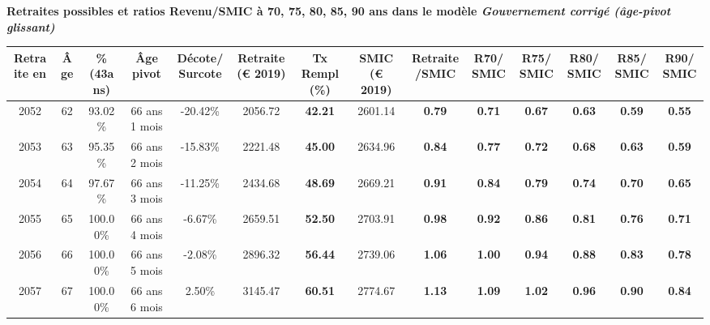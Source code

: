  \vspace{0.1cm} 
{\bf \noindent Retraites possibles et ratios Revenu/SMIC à 70, 75, 80, 85, 90 ans dans le modèle \emph{Gouvernement corrigé (âge-pivot glissant)}}  
 
\begin{adjustbox}{max width=\textwidth} 
\begin{tabular}[htb]{|c|c||c|c|c||c|c||c|c||c|c|c|c|c|} 
\hline 
 Retraite en &  Âge &  \%(43ans) &  Âge pivot &  Décote/Surcote &  Retraite (\euro{} 2019) &  Tx Rempl(\%) &  SMIC (\euro{} 2019) &  Retraite/SMIC &  R70/SMIC &  R75/SMIC &  R80/SMIC &  R85/SMIC &  R90/SMIC \\ 
\hline \hline 
 2052 &  62 &  93.02\% &  66 ans 1 mois &  -20.42\% &  2056.72 &  {\bf 42.21} &  2601.14 &  {\bf {\color{red} 0.79}} &  {\bf {\color{red} 0.71}} &  {\bf {\color{red} 0.67}} &  {\bf {\color{red} 0.63}} &  {\bf {\color{red} 0.59}} &  {\bf {\color{red} 0.55}} \\ 
\hline 
 2053 &  63 &  95.35\% &  66 ans 2 mois &  -15.83\% &  2221.48 &  {\bf 45.00} &  2634.96 &  {\bf {\color{red} 0.84}} &  {\bf {\color{red} 0.77}} &  {\bf {\color{red} 0.72}} &  {\bf {\color{red} 0.68}} &  {\bf {\color{red} 0.63}} &  {\bf {\color{red} 0.59}} \\ 
\hline 
 2054 &  64 &  97.67\% &  66 ans 3 mois &  -11.25\% &  2434.68 &  {\bf 48.69} &  2669.21 &  {\bf {\color{red} 0.91}} &  {\bf {\color{red} 0.84}} &  {\bf {\color{red} 0.79}} &  {\bf {\color{red} 0.74}} &  {\bf {\color{red} 0.70}} &  {\bf {\color{red} 0.65}} \\ 
\hline 
 2055 &  65 &  100.00\% &  66 ans 4 mois &  -6.67\% &  2659.51 &  {\bf 52.50} &  2703.91 &  {\bf {\color{red} 0.98}} &  {\bf {\color{red} 0.92}} &  {\bf {\color{red} 0.86}} &  {\bf {\color{red} 0.81}} &  {\bf {\color{red} 0.76}} &  {\bf {\color{red} 0.71}} \\ 
\hline 
 2056 &  66 &  100.00\% &  66 ans 5 mois &  -2.08\% &  2896.32 &  {\bf 56.44} &  2739.06 &  {\bf 1.06} &  {\bf 1.00} &  {\bf {\color{red} 0.94}} &  {\bf {\color{red} 0.88}} &  {\bf {\color{red} 0.83}} &  {\bf {\color{red} 0.78}} \\ 
\hline 
 2057 &  67 &  100.00\% &  66 ans 6 mois &  2.50\% &  3145.47 &  {\bf 60.51} &  2774.67 &  {\bf 1.13} &  {\bf 1.09} &  {\bf 1.02} &  {\bf {\color{red} 0.96}} &  {\bf {\color{red} 0.90}} &  {\bf {\color{red} 0.84}} \\ 
\hline 
\hline 
\end{tabular} 
\end{adjustbox} 
 
